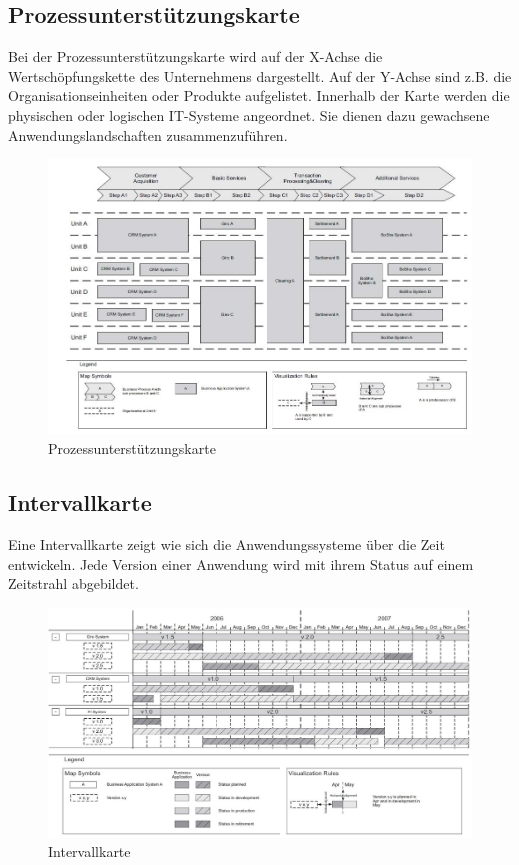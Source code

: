 \subsection{Prozessunterstützungskarte}

Bei der Prozessunterstützungskarte wird auf der X-Achse die Wertschöpfungskette des Unternehmens dargestellt. Auf der Y-Achse sind z.B. die Organisationseinheiten oder Produkte aufgelistet. Innerhalb der Karte werden die physischen oder logischen IT-Systeme angeordnet. Sie dienen dazu gewachsene Anwendungslandschaften zusammenzuführen.

\begin{figure}[h!]
\centering
\includegraphics[width=\linewidth]{fig/prozessunterstuetzungskarte}
\caption{Prozessunterstützungskarte}
\label{fig:prozessunterstuetzungskarte}
\end{figure}

\subsection{Intervallkarte}

Eine Intervallkarte zeigt wie sich die Anwendungssysteme über die Zeit entwickeln. Jede Version einer Anwendung wird mit ihrem Status auf einem Zeitstrahl abgebildet.

\begin{figure}[h!]
\centering
\includegraphics[width=\linewidth]{fig/intervallkarte}
\caption{Intervallkarte}
\label{fig:intervallkarte}
\end{figure}

